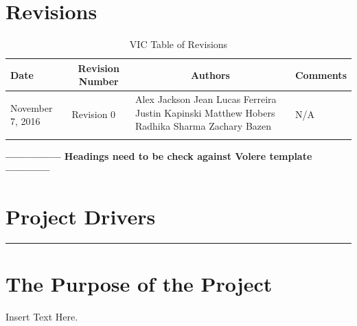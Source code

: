 \documentclass [12pt]{article}
\begin{document}

\pagebreak

\tableofcontents
\listoftables

\pagebreak


\section{Revisions}
\begin{longtable}{| p{ } | p{ } | p{ } | p{ } |}

\hline 
\centering \textbf{Date} & 
\multicolumn{1}{c}{\textbf {Revision Number}} &
\multicolumn{1}{|c}{\textbf {Authors}} & 
\multicolumn{1}{|c|}{\textbf {Comments}} \\ \hline

\multirow{4}{*}{\centering November 7, 2016}  & 
\multirow{4}{*}{Revision 0}& 
{Alex Jackson \newline
Jean Lucas Ferreira \newline
Justin Kapinski\newline
Matthew Hobers\newline
Radhika Sharma\newline
Zachary Bazen}
&
 \multirow{4}{*}{N/A} \\ 
\hline 

\caption{VIC Table of Revisions} 
\end{longtable}
\pagebreak
{\huge \noindent  \textbf { --------------- Headings need to be check against Volere template ------------}}
\section *{\Large Project Drivers \vspace*{-6mm}}\rule{6.5in}{.1em} 



\section{The Purpose of the Project} 
 Insert Text Here.
 
\end{document}
